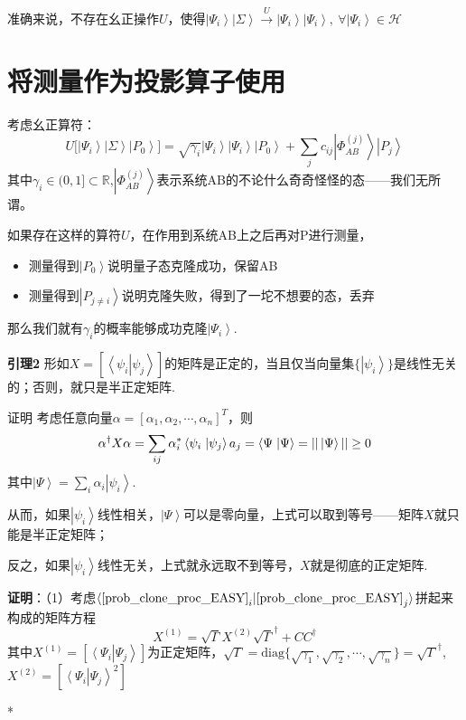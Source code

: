 \documentclass[UTF8]{ctexart}
\newcommand\ket[1]{\left|#1\right\rangle}
\newcommand\qinner[2]{\left\langle#1\right.\left|#2\right\rangle}
\newcommand\g{\gamma}
\newcommand\diag{\mathrm{diag}}
\begin{document}
准确来说，不存在幺正操作$U$，使得$\ket{\Psi_i}\ket{\Sigma}\xrightarrow{U}\ket{\Psi_i}\ket{\Psi_i},\ \forall\ket{\Psi_i}\in\mathcal{H}$

\section{将测量作为投影算子使用}

考虑幺正算符：
$$
U\big[\ket{\Psi_i}\ket{\Sigma}\ket{P_0}\big]=\sqrt{\g_i}\ket{\Psi_i}\ket{\Psi_i}\ket{P_0}+\sum_jc_{ij}\ket{\Phi_{AB}^{(j)}}\ket{P_j}\label{prob_clone_proc_EASY}
$$
其中$\g_i\in(0,1]\subset\mathbb{R}$,$\ket{\Phi_{AB}^{(j)}}$表示系统AB的不论什么奇奇怪怪的态——我们无所谓。

如果存在这样的算符$U$，在作用到系统AB上之后再对P进行测量，

\begin{itemize}	\item 测量得到$\ket{P_0}$说明量子态克隆成功，保留AB
	\item 测量得到$\ket{P_{j\neq i}}$说明克隆失败，得到了一坨不想要的态，丢弃
\end{itemize}
那么我们就有$\gamma_i$的概率能够成功克隆$\ket{\Psi_i}$.



\textbf{引理2} 形如$X=[\qinner{\psi_i}{\psi_j}]$的矩阵是正定的，当且仅当向量集$\{\ket{\psi_i}\}$是线性无关的；否则，就只是半正定矩阵.

证明 考虑任意向量$\alpha=[\alpha_1,\alpha_2,\cdots,\alpha_n]^T$，则
$$
\alpha^\dagger X\alpha=\sum_{ij}\alpha_i^*\qinner{\psi_i}{\psi_j}a_j\\
=\qinner{\Psi}{\Psi}=||\ket{\Psi}||\ge0
$$
其中$\ket{\Psi}=\sum_i\alpha_i\ket{\psi_i}.$

从而，如果$\ket{\psi_i}$线性相关，$\ket{\Psi}$可以是零向量，上式可以取到等号——矩阵$X$就只能是半正定矩阵；

反之，如果$\ket{\psi_i}$线性无关，上式就永远取不到等号，$X$就是彻底的正定矩阵.



\textbf{证明}：（1）考虑$\langle\eqref{prob_clone_proc_EASY}_i|\eqref{prob_clone_proc_EASY}_j\rangle$拼起来构成的矩阵方程
$$
X^{(1)}=\sqrt\Gamma X^{(2)}\sqrt\Gamma^\dagger+CC^\dagger
$$
其中$X^{(1)}=[\qinner{\Psi_i}{\Psi_j}]$为正定矩阵，$\sqrt\Gamma=\diag\{\sqrt{\g_1},\sqrt{\g_2},\cdots,\sqrt{\g_n}\}=\sqrt\Gamma^\dagger$,$X^{(2)}=\left[\qinner{\Psi_i}{\Psi_j}^2\right]$

\begin{center}
	*\quad*\quad*
\end{center}
\end{document}
